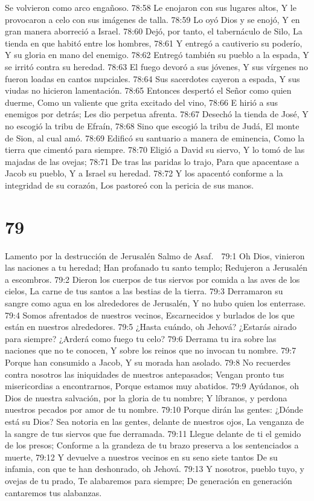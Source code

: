 Se volvieron como arco engañoso. 
78:58 Le enojaron con sus lugares altos, 
Y le provocaron a celo con sus imágenes de talla. 
78:59 Lo oyó Dios y se enojó, 
Y en gran manera aborreció a Israel. 
78:60 Dejó, por tanto, el tabernáculo de Silo, 
La tienda en que habitó entre los hombres, 
78:61 Y entregó a cautiverio su poderío, 
Y su gloria en mano del enemigo. 
78:62 Entregó también su pueblo a la espada, 
Y se irritó contra su heredad. 
78:63 El fuego devoró a sus jóvenes, 
Y sus vírgenes no fueron loadas en cantos nupciales. 
78:64 Sus sacerdotes cayeron a espada, 
Y sus viudas no hicieron lamentación. 
78:65 Entonces despertó el Señor como quien duerme, 
Como un valiente que grita excitado del vino, 
78:66 E hirió a sus enemigos por detrás; 
Les dio perpetua afrenta. 
78:67 Desechó la tienda de José, 
Y no escogió la tribu de Efraín, 
78:68 Sino que escogió la tribu de Judá, 
El monte de Sion, al cual amó. 
78:69 Edificó su santuario a manera de eminencia, 
Como la tierra que cimentó para siempre. 
78:70 Eligió a David su siervo, 
Y lo tomó de las majadas de las ovejas; 
78:71 De tras las paridas lo trajo, 
Para que apacentase a Jacob su pueblo, 
Y a Israel su heredad. 
78:72 Y los apacentó conforme a la integridad de su corazón, 
Los pastoreó con la pericia de sus manos. 

\chapter{79}

Lamento por la destrucción de Jerusalén 
Salmo de Asaf. 

79:1 Oh Dios, vinieron las naciones a tu heredad; 
Han profanado tu santo templo; 
Redujeron a Jerusalén a escombros. 
79:2 Dieron los cuerpos de tus siervos por comida a las aves de los cielos, 
La carne de tus santos a las bestias de la tierra. 
79:3 Derramaron su sangre como agua en los alrededores de Jerusalén, 
Y no hubo quien los enterrase. 
79:4 Somos afrentados de nuestros vecinos, 
Escarnecidos y burlados de los que están en nuestros alrededores. 
79:5 ¿Hasta cuándo, oh Jehová? ¿Estarás airado para siempre? 
¿Arderá como fuego tu celo? 
79:6 Derrama tu ira sobre las naciones que no te conocen, 
Y sobre los reinos que no invocan tu nombre. 
79:7 Porque han consumido a Jacob, 
Y su morada han asolado. 
79:8 No recuerdes contra nosotros las iniquidades de nuestros antepasados; 
Vengan pronto tus misericordias a encontrarnos, 
Porque estamos muy abatidos. 
79:9 Ayúdanos, oh Dios de nuestra salvación, por la gloria de tu nombre; 
Y líbranos, y perdona nuestros pecados por amor de tu nombre. 
79:10 Porque dirán las gentes: ¿Dónde está su Dios? 
Sea notoria en las gentes, delante de nuestros ojos, 
La venganza de la sangre de tus siervos que fue derramada. 
79:11 Llegue delante de ti el gemido de los presos; 
Conforme a la grandeza de tu brazo preserva a los sentenciados a muerte, 
79:12 Y devuelve a nuestros vecinos en su seno siete tantos 
De su infamia, con que te han deshonrado, oh Jehová. 
79:13 Y nosotros, pueblo tuyo, y ovejas de tu prado, 
Te alabaremos para siempre; 
De generación en generación cantaremos tus alabanzas. 


